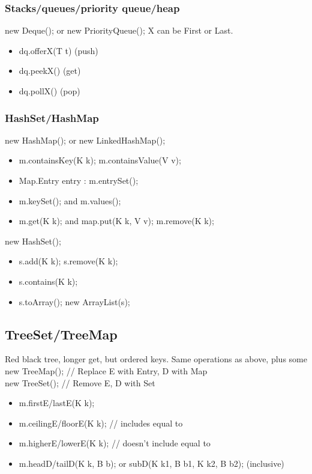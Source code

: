 \subsubsection{Stacks/queues/priority queue/heap}
new Deque(); or new PriorityQueue();
X can be First or Last.
\begin{itemize}
    \itemsep0em
    \item dq.offerX(T t) (push)
    \item dq.peekX() (get)
    \item dq.pollX() (pop)
\end{itemize}
\subsubsection{HashSet/HashMap}
new HashMap(); or new LinkedHashMap();
\begin{itemize}
    \itemsep0em
    \item m.containsKey(K k); m.containsValue(V v);
    \item Map.Entry entry : m.entrySet();
    \item m.keySet(); and m.values();
    \item m.get(K k); and map.put(K k, V v); m.remove(K k);
\end{itemize}
new HashSet();
\begin{itemize}
    \itemsep0em
    \item s.add(K k); s.remove(K k);
    \item s.contains(K k);
    \item s.toArray(); new ArrayList(s);
\end{itemize}
\subsection{TreeSet/TreeMap}
Red black tree, longer get, but ordered keys. Same operations as above, plus some\\
new TreeMap(); // Replace E with Entry, D with Map\\
new TreeSet(); // Remove E, D with Set
\begin{itemize}
    \itemsep0em
    \item m.firstE/lastE(K k);
    \item m.ceilingE/floorE(K k); // includes equal to
    \item m.higherE/lowerE(K k); // doesn't include equal to
    \item m.headD/tailD(K k, B b); or subD(K k1, B b1, K k2, B b2); (inclusive)
\end{itemize}